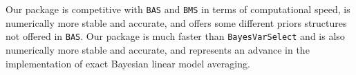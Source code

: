Our package is competitive with {\tt BAS} and {\tt BMS} in terms of computational speed, is numerically more
stable and accurate, and offers some different priors structures not offered in {\tt BAS}. Our package is much
faster than {\tt BayesVarSelect} and is also numerically more stable and accurate, and represents an advance
in the implementation of exact Bayesian linear model averaging.
